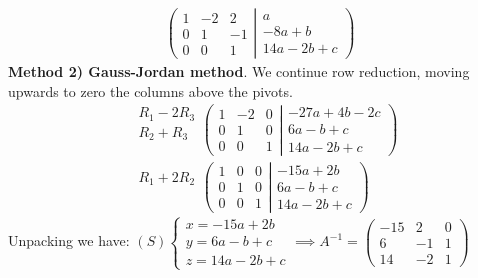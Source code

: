 \documentclass[usenames,dvipsnames,aspectratio=169,10pt]{beamer}
\numberwithin{equation}{section}
\begin{document}
\begin{frame}\vspace{-0.6cm}
\begin{align*}
\left(
	\begin{matrix}
   1 &  -2 &  2 \\
   0 &   1 & -1 \\
   0 &   0 &  1
	\end{matrix}
  \left|
	\begin{matrix}
		a \\
		-8a + b \\
		14a -2b + c
	\end{matrix}
  \right.
\right)
\end{align*}
\textbf{Method 2) Gauss-Jordan method}. We continue row reduction, moving upwards to zero the columns above the pivots.
\begin{align*}
&
\begin{array}{l}
 R_1 - 2R_3  \\
 R_2 +  R_3 \\
 \\
\end{array}
\left(
	\begin{matrix}
   1 &  -2 &  0 \\
   0 &   1 &  0 \\
   0 &   0 &  1
	\end{matrix}
  \left|
	\begin{matrix}
		-27a + 4b -2c \\
		6a - b + c \\
		14a -2b + c
	\end{matrix}
  \right.
\right)
\\
&
\begin{array}{l}
 R_1 + 2R_2  \\
 \\
 \\
\end{array}
\left(
	\begin{matrix}
   1 &  0 &  0 \\
   0 &  1 &  0 \\
   0 &  0 &  1
	\end{matrix}
  \left|
	\begin{matrix}
		-15a + 2b  \\
		6a - b + c \\
		14a -2b + c
	\end{matrix}
  \right.
\right)
\end{align*}
Unpacking we have:
$(S) 
\begin{cases}
x = -15a + 2b \\
y = 6a - b + c \\
z = 14a -2b + c
\end{cases}
\implies
A^{-1} =
\begin{pmatrix}
	-15 &  2 &  0 \\
	  6 & -1 &  1 \\
	 14 & -2 &  1
\end{pmatrix}$
\end{frame}
\end{document}
